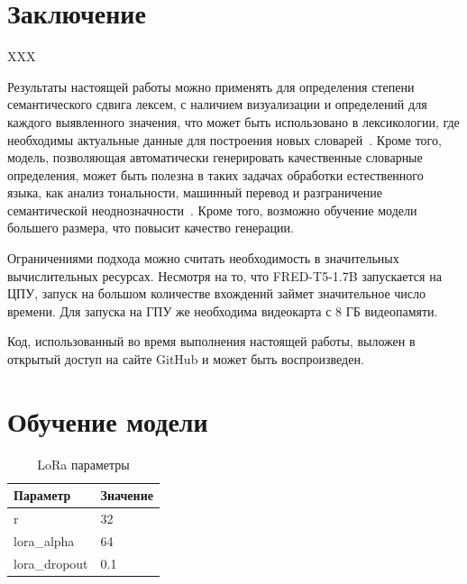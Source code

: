 \documentclass[LI,VKR]{HSEUniversity}
\begin{document}
\chapter*{Заключение}


XXX

Результаты настоящей работы можно применять для определения степени семантического сдвига лексем,
с наличием визуализации и определений для каждого выявленного значения,
что может быть использовано в лексикологии,
где необходимы актуальные данные для построения новых словарей~\cite{DefinitionGenerationMainArticle}.
Кроме того, модель, позволяющая автоматически генерировать качественные словарные определения,
может быть полезна в таких задачах обработки естественного языка,
как анализ тональности, машинный перевод и разграничение семантической
неоднозначности~\cite{DefinitionModelingReviewAndDatasetAnalysis}.
Кроме того, возможно обучение модели большего размера, что повысит качество генерации.

Ограничениями подхода можно считать необходимость в значительных вычислительных ресурсах.
Несмотря на то, что FRED-T5-1.7B запускается на ЦПУ, запуск на большом количестве вхождений
займет значительное число времени.
Для запуска на ГПУ же необходима видеокарта с 8 ГБ видеопамяти.

Код, использованный во время выполнения настоящей работы, выложен в открытый доступ
на сайте GitHub и может быть воспроизведен.~\cite{WorkGitHub}

\printbibliography
\appendix
\chapter{Обучение модели}

\begin{longtable}{ll}
\caption{LoRa параметры} \\
\hline
\textbf{Параметр} & \textbf{Значение} \\
\hline
r & 32 \\
lora\_alpha & 64 \\
lora\_dropout & 0.1 \\
\hline
\end{longtable}
\end{document}
